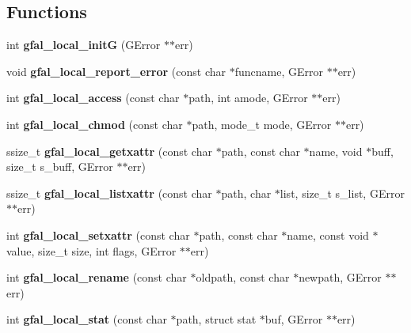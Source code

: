 \subsection*{Functions}
\begin{CompactItemize}
\item 
int \textbf{gfal\_\-local\_\-init\-G} (GError $\ast$$\ast$err)\label{gfal__posix__local__file_8c_3018fb6ca27f7e5da4056bcfc5b76713}

\item 
void \textbf{gfal\_\-local\_\-report\_\-error} (const char $\ast$funcname, GError $\ast$$\ast$err)\label{gfal__posix__local__file_8c_2de9f8c077a2d44c1f4c1656ac5a20fc}

\item 
int \textbf{gfal\_\-local\_\-access} (const char $\ast$path, int amode, GError $\ast$$\ast$err)\label{gfal__posix__local__file_8c_a98ca73fb3083a78f5d85b1f298a8b97}

\item 
int \textbf{gfal\_\-local\_\-chmod} (const char $\ast$path, mode\_\-t mode, GError $\ast$$\ast$err)\label{gfal__posix__local__file_8c_d6c6d5590083bbcef4833f8186a629f3}

\item 
ssize\_\-t \textbf{gfal\_\-local\_\-getxattr} (const char $\ast$path, const char $\ast$name, void $\ast$buff, size\_\-t s\_\-buff, GError $\ast$$\ast$err)\label{gfal__posix__local__file_8c_6f5556fe718ce94ebbf6ae370b0ef682}

\item 
ssize\_\-t \textbf{gfal\_\-local\_\-listxattr} (const char $\ast$path, char $\ast$list, size\_\-t s\_\-list, GError $\ast$$\ast$err)\label{gfal__posix__local__file_8c_b394025dfe400fe90fd7a692fd7eafea}

\item 
int \textbf{gfal\_\-local\_\-setxattr} (const char $\ast$path, const char $\ast$name, const void $\ast$value, size\_\-t size, int flags, GError $\ast$$\ast$err)\label{gfal__posix__local__file_8c_66e03c90490c247aed2eb0aaadbaf250}

\item 
int \textbf{gfal\_\-local\_\-rename} (const char $\ast$oldpath, const char $\ast$newpath, GError $\ast$$\ast$err)\label{gfal__posix__local__file_8c_360b4701633deaae52f9f77c94173405}

\item 
int \textbf{gfal\_\-local\_\-stat} (const char $\ast$path, struct stat $\ast$buf, GError $\ast$$\ast$err)\label{gfal__posix__local__file_8c_dc96268400be1d41613ab796237c1cb8}


\end{CompactItemize}
